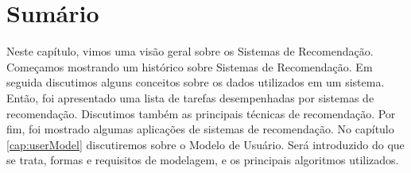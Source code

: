 \section{Sumário}

Neste capítulo, vimos uma visão geral sobre os Sistemas de Recomendação. Começamos mostrando um histórico sobre Sistemas de Recomendação. Em seguida discutimos alguns conceitos sobre os dados utilizados em um sistema. Então, foi apresentado uma lista de tarefas desempenhadas por sistemas de recomendação. Discutimos também as principais técnicas de recomendação. Por fim, foi mostrado algumas aplicações de sistemas de recomendação. No capítulo \ref{cap:userModel} discutiremos sobre o Modelo de Usuário. Será introduzido do que se trata, formas e requisitos de modelagem, e os principais algoritmos utilizados.